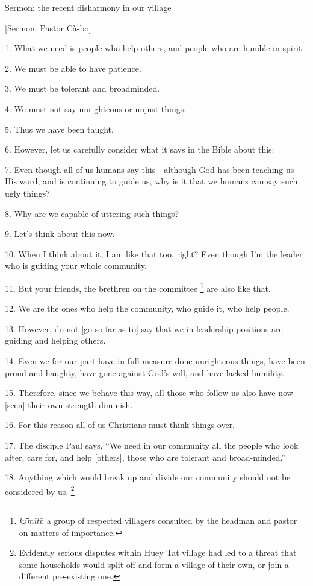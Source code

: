 
Sermon: the recent disharmony in our village

[Sermon: Pastor Cà-bo]

1. What we need is people who help others, and people who are humble in spirit.

2. We must be able to have patience.

3. We must be tolerant and broadminded.

4. We must not say unrighteous or unjust things.

5. Thus we have been taught.

6. However, let us carefully consider what it says in the Bible about this:

7. Even though all of us humans say this---although God has been teaching us His
word, and is continuing to guide us, why is it that we humans can say such ugly
things?

8. Why are we capable of uttering such things?

9. Let's think about this now.

10. When I think about it, I am like that too, right? Even though I'm the leader
who is guiding your whole community.

11. But your friends, the brethren on the committee \footnote{\textit{kɔ̄mītī}: a group of respected villagers consulted by the headman and pastor on matters of importance.} are also like that.

12. We are the ones who help the community, who guide it, who help people.

13. However, do not [go so far as to] say that we in leadership positions are guiding
and helping others.

14. Even we for our part have in full measure done unrighteous things, have been
proud and haughty, have gone against God's will, and have lacked humility.

15. Therefore, since we behave this way, all those who follow us also have now
[seen] their own strength diminish.

16. For this reason all of us Christians must think things over.

17. The disciple Paul says, ``We need in our community all the people who look
after, care for, and help [others], those who are tolerant and broad-minded.''

18. Anything which would break up and divide our community should not be considered
by us. \footnote{Evidently serious disputes within Huey Tat village had led to a threat that some households would split off and form a village of their own, or join a different pre-existing one.}


